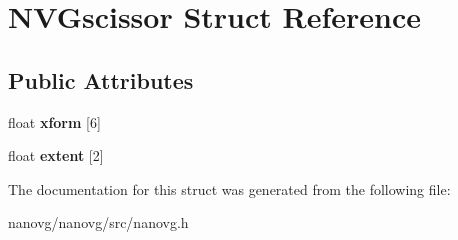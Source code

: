 \hypertarget{struct_n_v_gscissor}{\section{N\+V\+Gscissor Struct Reference}
\label{struct_n_v_gscissor}
}
\subsection*{Public Attributes}
\begin{DoxyCompactItemize}
\item 
\hypertarget{struct_n_v_gscissor_a4ada1cb908081972303b3c793064e15a}{float {\bfseries xform} \mbox{[}6\mbox{]}}\label{struct_n_v_gscissor_a4ada1cb908081972303b3c793064e15a}

\item 
\hypertarget{struct_n_v_gscissor_a6188121936c43f1c32cfca66ab1234a2}{float {\bfseries extent} \mbox{[}2\mbox{]}}\label{struct_n_v_gscissor_a6188121936c43f1c32cfca66ab1234a2}

\end{DoxyCompactItemize}


The documentation for this struct was generated from the following file\+:\begin{DoxyCompactItemize}
\item 
nanovg/nanovg/src/nanovg.\+h\end{DoxyCompactItemize}
